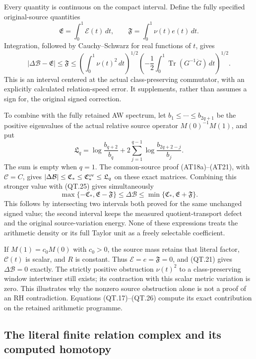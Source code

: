 Every quantity is continuous on the compact interval. Define the
fully specified original-source quantities
\[
 \mathfrak E=\int_0^1\mathcal E(t)\,dt,\qquad
 \mathfrak F=\int_0^1\nu(t)e(t)\,dt.
 \]
Integration, followed by Cauchy--Schwarz for real functions of \(t\),
gives
\[
 \boxed{\quad
 |\Delta\mathcal B-\mathfrak E|\le\mathfrak F
 \le
 \left(\int_0^1\nu(t)^2\,dt\right)^{1/2}
 \left(-\frac12\int_0^1\operatorname{Tr}(G^{-1}\ddot G)\,dt\right)^{1/2}.
 \quad}
 \tag{QT.25}\label{eq:qt-globalbound}
\]
This is an interval centered at the actual class-preserving
commutator, with an explicitly calculated relation-speed error.
It supplements, rather than assumes a sign for, the original
signed correction.

To combine with the fully retained AW spectrum, let
\(b_1\le\cdots\le b_{2q+1}\) be the positive eigenvalues of the actual
relative source operator \(M(0)^{-1}M(1)\), and put
\[
 \mathfrak L_q=
 \log\frac{b_{q+2}}{b_q}
       +2\sum_{j=1}^{q-1}\log\frac{b_{2q+2-j}}{b_j}.
 \]
The sum is empty when \(q=1\).
The common-source proof (AT18a)--(AT21), with $\mathcal C=C$,
gives $|\Delta\mathcal B|\le\mathfrak C_*\le
\mathfrak C_*^{\rm ov}\le\mathfrak L_q$ on these exact matrices.
Combining this stronger value with (QT.25) gives simultaneously
\[
 \boxed{\quad
 \max\{-\mathfrak C_*,\mathfrak E-\mathfrak F\}
 \le\Delta\mathcal B\le
 \min\{\mathfrak C_*,\mathfrak E+\mathfrak F\}.
 \quad}
 \tag{QT.26}\label{eq:qt-intersection}
\]
This follows by intersecting two intervals both proved for the same
unchanged signed value; the second interval keeps the measured
quotient-transport defect and the original source-variation energy.
None of these expressions treats the arithmetic density or its full
Taylor unit as a freely selectable coefficient.

If \(M(1)=c_0M(0)\) with \(c_0>0\), the source mass retains that
literal factor, \(\mathcal C(t)\) is scalar, and \(R\) is constant.
Thus \(\mathcal E=e=\mathfrak F=0\), and (QT.21) gives
\(\Delta\mathcal B=0\) exactly. The strictly positive obstruction
\(\nu(t)^2\) to a class-preserving window intertwiner still exists;
its contraction with this scalar metric variation is zero.
This illustrates why the nonzero source obstruction alone is not
a proof of an RH contradiction. Equations (QT.17)--(QT.26) compute
its exact contribution on the retained arithmetic programme.

\subsection{The literal finite relation complex and its computed homotopy}


